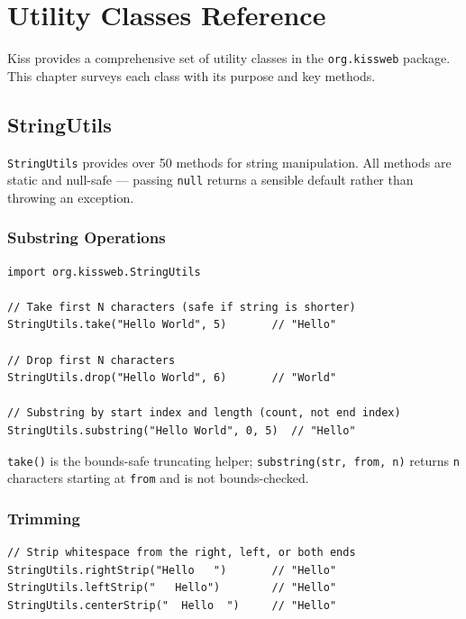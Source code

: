 \chapter{Utility Classes Reference}
\label{ch:utilities}

Kiss provides a comprehensive set of utility classes in the \texttt{org.kissweb} package.  This chapter surveys each class with its purpose and key methods.

\section{StringUtils}
\label{sec:util-string}

\texttt{StringUtils} provides over 50 methods for string manipulation.  All methods are static and null-safe --- passing \texttt{null} returns a sensible default rather than throwing an exception.

\subsection{Substring Operations}

\begin{lstlisting}[style=groovy]
import org.kissweb.StringUtils

// Take first N characters (safe if string is shorter)
StringUtils.take("Hello World", 5)       // "Hello"

// Drop first N characters
StringUtils.drop("Hello World", 6)       // "World"

// Substring by start index and length (count, not end index)
StringUtils.substring("Hello World", 0, 5)  // "Hello"
\end{lstlisting}

\noindent
\texttt{take()} is the bounds-safe truncating helper; \texttt{substring(str, from, n)} returns \texttt{n} characters starting at \texttt{from} and is not bounds-checked.

\subsection{Trimming}

\begin{lstlisting}[style=groovy]
// Strip whitespace from the right, left, or both ends
StringUtils.rightStrip("Hello   ")       // "Hello"
StringUtils.leftStrip("   Hello")        // "Hello"
StringUtils.centerStrip("  Hello  ")     // "Hello"
\end{lstlisting}

